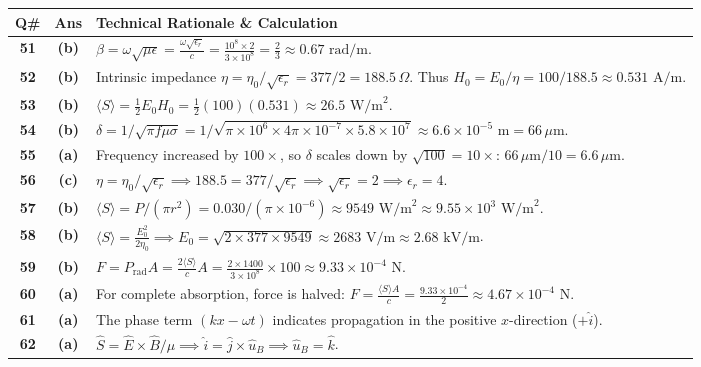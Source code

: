 {\small
\noindent\begin{tabularx}{\textwidth}{|c|c|X|}
\hline
\textbf{Q\#} & \textbf{Ans} & \textbf{Technical Rationale \& Calculation} \\
\hline
\textbf{51} & \textbf{(b)} & $\beta = \omega\sqrt{\mu\epsilon} = \frac{\omega\sqrt{\epsilon_r}}{c} = \frac{10^8 \times 2}{3 \times 10^8} = \frac{2}{3} \approx 0.67\text{ rad/m}$. \\ \hline
\textbf{52} & \textbf{(b)} & Intrinsic impedance $\eta = \eta_0/\sqrt{\epsilon_r} = 377/2 = 188.5\,\Omega$. Thus $H_0 = E_0/\eta = 100/188.5 \approx 0.531\text{ A/m}$. \\ \hline
\textbf{53} & \textbf{(b)} & $\langle S \rangle = \frac{1}{2} E_0 H_0 = \frac{1}{2}(100)(0.531) \approx 26.5\text{ W/m}^2$. \\ \hline
\textbf{54} & \textbf{(b)} & $\delta = 1/\sqrt{\pi f \mu \sigma} = 1/\sqrt{\pi \times 10^6 \times 4\pi\times 10^{-7} \times 5.8\times 10^7} \approx 6.6 \times 10^{-5}\text{ m} = 66\,\mu\text{m}$. \\ \hline
\textbf{55} & \textbf{(a)} & Frequency increased by $100\times$, so $\delta$ scales down by $\sqrt{100} = 10\times$: $66\,\mu\text{m} / 10 = 6.6\,\mu\text{m}$. \\ \hline
\textbf{56} & \textbf{(c)} & $\eta = \eta_0/\sqrt{\epsilon_r} \implies 188.5 = 377/\sqrt{\epsilon_r} \implies \sqrt{\epsilon_r} = 2 \implies \epsilon_r = 4$. \\ \hline
\textbf{57} & \textbf{(b)} & $\langle S \rangle = P/(\pi r^2) = 0.030 / (\pi \times 10^{-6}) \approx 9549\text{ W/m}^2 \approx 9.55 \times 10^3\text{ W/m}^2$. \\ \hline
\textbf{58} & \textbf{(b)} & $\langle S \rangle = \frac{E_0^2}{2\eta_0} \implies E_0 = \sqrt{2 \times 377 \times 9549} \approx 2683\text{ V/m} \approx 2.68\text{ kV/m}$. \\ \hline
\textbf{59} & \textbf{(b)} & $F = P_{\text{rad}} A = \frac{2\langle S \rangle}{c} A = \frac{2 \times 1400}{3 \times 10^8} \times 100 \approx 9.33 \times 10^{-4}\text{ N}$. \\ \hline
\textbf{60} & \textbf{(a)} & For complete absorption, force is halved: $F = \frac{\langle S \rangle A}{c} = \frac{9.33 \times 10^{-4}}{2} \approx 4.67 \times 10^{-4}\text{ N}$. \\ \hline
\textbf{61} & \textbf{(a)} & The phase term $(kx - \omega t)$ indicates propagation in the positive $x$-direction ($+\hat{i}$). \\ \hline
\textbf{62} & \textbf{(a)} & $\hat{S} = \hat{E} \times \hat{B}/\mu \implies \hat{i} = \hat{j} \times \hat{u}_B \implies \hat{u}_B = \hat{k}$. \\ \hline

\end{tabularx}}
